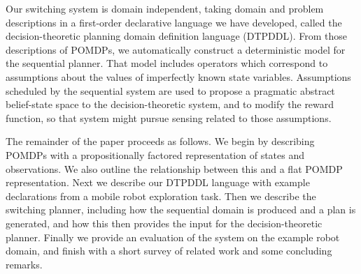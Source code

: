
Our switching system is domain independent, taking domain and problem
descriptions in a first-order declarative language we have developed,
called the decision-theoretic planning domain definition language
(DTPDDL). From those descriptions of POMDPs, we automatically
construct a deterministic model for the sequential planner. That model
includes operators which correspond to assumptions about the values of
imperfectly known state variables. Assumptions scheduled by the
sequential system are used to propose a pragmatic abstract
belief-state space to the decision-theoretic system, and to modify the
reward function, so that system might pursue sensing related to those
assumptions.





The remainder of the paper proceeds as follows. We begin by describing
POMDPs with a propositionally factored representation of states and
observations. We also outline the relationship between this and a flat
POMDP representation. Next we describe our DTPDDL language with
example declarations from a mobile robot exploration task. Then we
describe the switching planner, including how the sequential domain is
produced and a plan is generated, and how this then provides the input
for the decision-theoretic planner. Finally we provide an evaluation
of the system on the example robot domain, and finish with a short
survey of related work and some concluding remarks.





